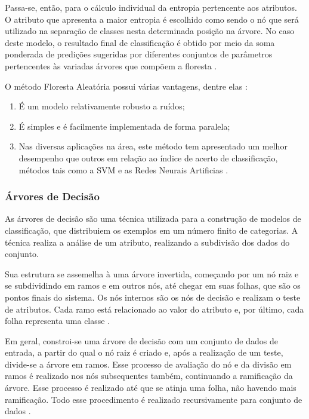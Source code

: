 Passa-se, então, para o cálculo individual da entropia pertencente aos atributos. O atributo que apresenta a maior entropia é escolhido como sendo o nó que será utilizado na separação de classes nesta determinada posição na árvore. No caso deste modelo, o resultado final de classificação é obtido por meio da soma ponderada de predições sugeridas por diferentes conjuntos de parâmetros pertencentes às variadas árvores que compõem a floresta .

O método Floresta Aleatória possui várias vantagens, dentre elas :

\begin{enumerate}
\item É um modelo relativamente robusto a ruídos;
\item É simples e é facilmente implementada de forma paralela;
\item Nas diversas aplicações na área, este método tem apresentado um melhor desempenho que outros em relação ao índice de acerto de classificação, métodos tais como a SVM e as Redes Neurais Artificias .
\end{enumerate}

\subsubsection{Árvores de Decisão}

As árvores de decisão são uma técnica utilizada para a construção de modelos de classificação, que distribuiem os exemplos em um número finito de categorias. A técnica realiza a análise de um atributo, realizando a subdivisão dos dados do conjunto.

Sua estrutura se assemelha à uma árvore invertida, começando por um nó raiz e se subdividindo em ramos e em outros nós, até chegar em suas folhas, que são os pontos finais do sistema. Os nós internos são os nós de decisão e realizam o teste de atributos. Cada ramo está relacionado ao valor do atributo e, por último, cada folha representa uma classe .

Em geral, constroi-se uma árvore de decisão com um conjunto de dados de entrada, a partir do qual o nó raiz é criado e, após a realização de um teste, divide-se a árvore em ramos. Esse processo de avaliação do nó e da divisão em ramos é realizado nos nós subsequentes também, continuando a ramificação da árvore. Esse processo é realizado até que se atinja uma folha, não havendo mais ramificação. Todo esse procedimento é realizado recursivamente para conjunto de dados .


